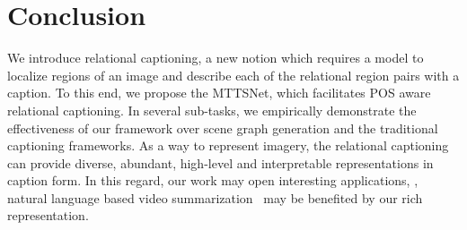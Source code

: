 \documentclass[10pt,twocolumn,letterpaper]{article}
\begin{document}
\begin{table}[t]
	\centering 
	\caption{Sentence based image retrieval performance compared to previous frameworks. We evaluate ranking using recall at  (R@, higher is better) and the median rank of the target image (Med, lower is better). 
\vspace{-4mm}}
    \label{table:retrieval}	
\end{table}
























   


 
\vspace{-2mm}
\section{Conclusion}
\vspace{-2mm}
We introduce relational captioning, a new notion which requires a model to localize regions of an image and describe each of the relational region pairs with a caption. 
To this end, we propose the MTTSNet, which facilitates POS aware relational captioning. 
In several sub-tasks, we empirically demonstrate the effectiveness of our framework over scene graph generation and the traditional captioning frameworks.
As a way to represent imagery, the relational captioning can provide diverse, abundant, high-level and interpretable representations in caption form.
In this regard, our work may open interesting applications, \eg, natural language based video summarization~\cite{choi2018contextually} may be benefited by our rich representation.
\newline
\end{document}
